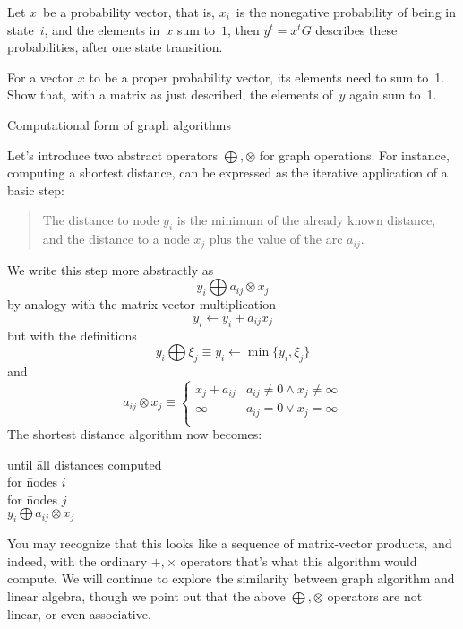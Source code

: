 Let $x$~be a probability vector, that is,
$x_i$~is the nonegative probability 
of being in state~$i$, and the elements in~$x$ sum to~$1$,
then $y^t=x^tG$ describes these probabilities,
after one state transition.

\begin{exercise}
For a vector $x$ to be a proper probability vector, its elements
need to sum to~1.
Show that, with a matrix as just described,
the elements of~$y$ again sum to~1.
\end{exercise}

 {Computational form of graph algorithms}
\label{app:graph-mult}

Let's introduce two abstract operators $\bigoplus,\otimes$
for graph operations.
For instance, computing a shortest distance, can be expressed
as the iterative application of a basic step:
\begin{quote}
  The distance to node $y_i$ is the minimum of the already known distance,
  and the distance to a node $x_j$ plus the value of the arc $a_{ij}$.
\end{quote}
We write this step more abstractly as
\[ y_i \bigoplus a_{ij}\otimes x_j \]
by analogy with the matrix-vector multiplication
\[ y_i \leftarrow y_i + a_{ij}x_j \]
but with the definitions
\[ y_i\bigoplus \xi_j \equiv y_i\leftarrow \min\{y_i,\xi_j\} \]
and
\[ a_{ij}\otimes x_j \equiv
\begin{cases}
  x_j+a_{ij}&a_{ij}\not=0 \wedge x_j\not=\infty\\
  \infty    &a_{ij}=0 \vee x_j=\infty\\
\end{cases}
\]
The shortest distance algorithm now becomes:

\begin{tabbing}
until \=all distances computed\\
\> for \=nodes $i$\\
\>\> for \=nodes $j$\\
\>\>\> $y_i \bigoplus a_{ij}\otimes x_j$\\
\end{tabbing}

You may recognize that this looks like a sequence of matrix-vector
products, and indeed, with the ordinary $+,\times$ operators
that's what this algorithm would compute.
We will continue to explore the similarity between graph algorithm
and linear algebra, though we point out that the above $\bigoplus,\otimes$
operators are not linear, or even associative.

